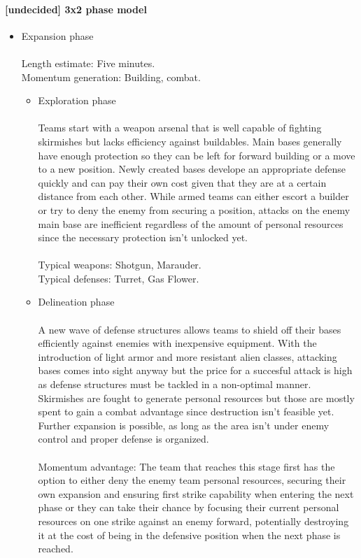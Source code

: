 \documentclass{scrartcl}
\newcommand{\undecided}[0]{\textcolor{undecided}{\textbf{[undecided] }}}
\begin{document}
\paragraph{\undecided 3x2 phase model}

\begin{itemize}
	\item Expansion phase \\\\
		Length estimate: Five minutes. \\
		Momentum generation: Building, combat. \\
		\begin{itemize}
		\item Exploration phase \\\\
			Teams start with a weapon arsenal that is well capable of fighting skirmishes but lacks efficiency against buildables. Main bases generally have enough protection so they can be left for forward building or a move to a new position. Newly created bases develope an appropriate defense quickly and can pay their own cost given that they are at a certain distance from each other. While armed teams can either escort a builder or try to deny the enemy from securing a position, attacks on the enemy main base are inefficient regardless of the amount of personal resources since the necessary protection isn't unlocked yet. \\\\
			Typical weapons: Shotgun, Marauder. \\
			Typical defenses: Turret, Gas Flower. \\
		\item Delineation phase \\\\
			A new wave of defense structures allows teams to shield off their bases efficiently against enemies with inexpensive equipment. With the introduction of light armor and more resistant alien classes, attacking bases comes into sight anyway but the price for a succesful attack is high as defense structures must be tackled in a non-optimal manner. Skirmishes are fought to generate personal resources but those are mostly spent to gain a combat advantage since destruction isn't feasible yet. Further expansion is possible, as long as the area isn't under enemy control and proper defense is organized. \\\\
			Momentum advantage: The team that reaches this stage first has the option to either deny the enemy team personal resources, securing their own expansion and ensuring first strike capability when entering the next phase or they can take their chance by focusing their current personal resources on one strike against an enemy forward, potentially destroying it at the cost of being in the defensive position when the next phase is reached. \\\\

\end{itemize}
\end{itemize}
\end{document}
